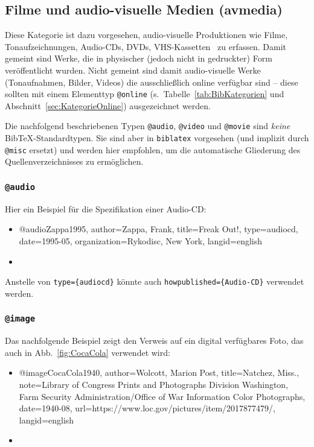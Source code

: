 \subsection{Filme und audio-visuelle Medien (\textsf{avmedia})}
\label{sec:KategorieAvmedia}

Diese Kategorie ist dazu vorgesehen, audio-visuelle Produktionen wie Filme,
Tonaufzeichnungen, Audio-CDs, DVDs, VHS-Kassetten \usw\ zu erfassen. Damit
gemeint sind Werke, die in physischer (jedoch nicht in gedruckter) Form
veröffentlicht wurden. Nicht gemeint sind damit audio-visuelle Werke
(Tonaufnahmen, Bilder, Videos) die ausschließlich online verfügbar sind --
diese sollten mit einem Elementtyp \texttt{@online} (s.\
Tabelle~\ref{tab:BibKategorien} und Abschnitt~\ref{sec:KategorieOnline})
ausgezeichnet werden.

Die nachfolgend beschriebenen Typen \texttt{@audio}, \texttt{@video} und
\texttt{@movie} sind \emph{keine} Bib\-TeX-Standardtypen. Sie sind aber in
\texttt{biblatex} vorgesehen (und implizit durch \texttt{@misc} ersetzt) und
werden hier empfohlen, um die automatische Gliederung des
Quellenverzeichnisses zu ermöglichen.

\subsubsection{\texttt{\bfseries @audio}}
\label{sec:@audio}
Hier ein Beispiel für die Spezifikation einer Audio-CD:
%
\begin{itemize}
\item[]
\begin{GenericCode}[numbers=none]
@audio{Zappa1995,
  author={Zappa, Frank},
  title={Freak Out!},
  type={audiocd},
  date={1995-05},
  organization={Rykodisc, New York},
  langid={english}
}
\end{GenericCode}
\item[\cite{Zappa1995}] 
\end{itemize}
%
Anstelle von \verb!type={audiocd}! könnte auch \verb!howpublished={Audio-CD}!
verwendet werden.

\subsubsection{\texttt{\bfseries @image}}
\label{sec:@image}

Das nachfolgende Beispiel zeigt den Verweis auf ein digital verfügbares Foto,
das auch in Abb.\ \ref{fig:CocaCola} verwendet wird:
%
\begin{itemize}
\item[]
\begin{GenericCode}[numbers=none]
@image{CocaCola1940,
  author={Wolcott, Marion Post},
  title={Natchez, Miss.},
  note={Library of Congress Prints and Photographs Division Washington, Farm Security Administration/Office of War Information Color Photographs},
  date={1940-08},
  url={https://www.loc.gov/pictures/item/2017877479/},
  langid={english}
}
\end{GenericCode}
\item[\cite{CocaCola1940}] 
\end{itemize}

